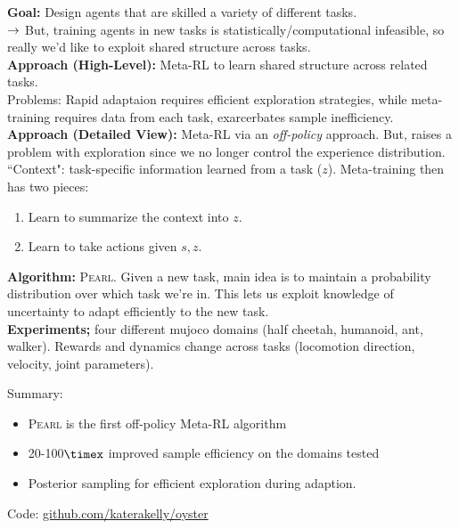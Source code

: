 {\bf Goal:} Design agents that are skilled a variety of different tasks. \\

$\rightarrow$ But, training agents in new tasks is statistically/computational infeasible, so really we'd like to exploit shared structure across tasks. \\

{\bf Approach (High-Level):} Meta-RL to learn shared structure across related tasks. \\

Problems: Rapid adaptaion requires efficient exploration strategies, while meta-training requires data from each task, exarcerbates sample inefficiency. \\

{\bf Approach (Detailed View):} Meta-RL via an {\it off-policy} approach. But, raises a problem with exploration since we no longer control the experience distribution. \\

``Context": task-specific information learned from a task ($z$). Meta-training then has two pieces:
\begin{enumerate}
    \item Learn to summarize the context into $z$.
    \item Learn to take actions given $s,z$.
\end{enumerate}

{\bf Algorithm:} \textsc{Pearl}. Given a new task, main idea is to maintain a probability distribution over which task we're in. This lets us exploit knowledge of uncertainty to adapt efficiently to the new task. \\

{\bf Experiments;} four different mujoco domains (half cheetah, humanoid, ant, walker). Rewards and dynamics change across tasks (locomotion direction, velocity, joint parameters). 

Summary:
\begin{itemize}
    \item \textsc{Pearl} is the first off-policy Meta-RL algorithm
    \item 20-100$\timex$ improved sample efficiency on the domains tested
    \item Posterior sampling for efficient exploration during adaption.
\end{itemize}

Code: \url{github.com/katerakelly/oyster} \\


